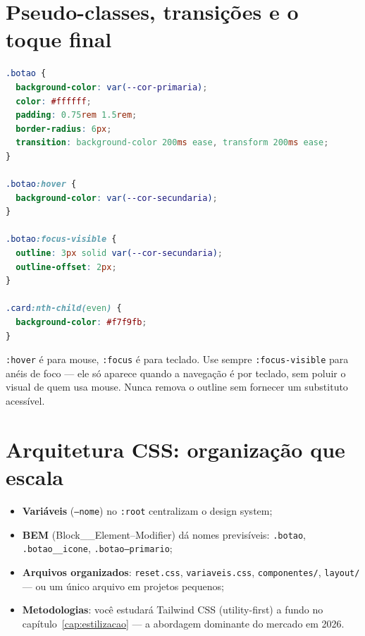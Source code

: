 \section{Pseudo-classes, transições e o toque final}

\begin{lstlisting}[style=livro, language=CSS,
  caption={Interações: hover, foco e transição.}, label={list:css-interacao}]
.botao {
  background-color: var(--cor-primaria);
  color: #ffffff;
  padding: 0.75rem 1.5rem;
  border-radius: 6px;
  transition: background-color 200ms ease, transform 200ms ease;
}

.botao:hover {
  background-color: var(--cor-secundaria);
}

.botao:focus-visible {
  outline: 3px solid var(--cor-secundaria);
  outline-offset: 2px;
}

.card:nth-child(even) {
  background-color: #f7f9fb;
}
\end{lstlisting}

\begin{caixaconceito}
\texttt{:hover} é para mouse, \texttt{:focus} é para teclado. Use sempre
\texttt{:focus-visible} para anéis de foco — ele só aparece quando a navegação
é por teclado, sem poluir o visual de quem usa mouse. Nunca remova o outline
sem fornecer um substituto acessível.
\end{caixaconceito}

\section{Arquitetura CSS: organização que escala}

\begin{itemize}[leftmargin=*, itemsep=0.4em]
  \item \textbf{Variáveis} (\texttt{--nome}) no \texttt{:root} centralizam o
  design system;
  \item \textbf{BEM} (Block\_\_Element--Modifier) dá nomes previsíveis:
  \texttt{.botao}, \texttt{.botao\_\_icone}, \texttt{.botao--primario};
  \item \textbf{Arquivos organizados}: \texttt{reset.css}, \texttt{variaveis.css},
  \texttt{componentes/}, \texttt{layout/} — ou um único arquivo em projetos pequenos;
  \item \textbf{Metodologias}: você estudará Tailwind CSS (utility-first) a
  fundo no capítulo~\ref{cap:estilizacao} — a abordagem dominante do mercado em 2026.
\end{itemize}

